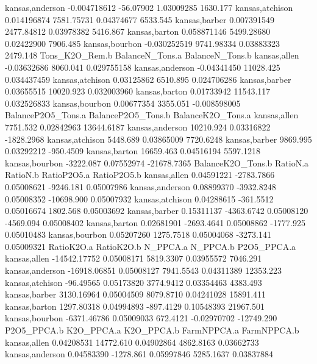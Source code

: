 \documentclass{report}
\begin{document}
\begin{Schunk}
\begin{Soutput}
kansas,anderson -0.004718612       -56.07902      1.03009285       1630.177
kansas,atchison  0.014196874      7581.75731      0.04374677       6533.545
kansas,barber    0.007391549      2477.84812      0.03978382       5416.867
kansas,barton    0.058871146      5499.28680      0.02422900       7906.485
kansas,bourbon  -0.030252519      9741.98334      0.03883323       2479.148
                Tons_K2O_Rem.b BalanceN_Tons.a BalanceN_Tons.b
kansas,allen       -0.03632686        8060.041     0.029755158
kansas,anderson    -0.04341450       11028.425     0.034437459
kansas,atchison     0.03125862        6510.895     0.024706286
kansas,barber       0.03655515       10020.923     0.032003960
kansas,barton       0.01733942       11543.117     0.032526833
kansas,bourbon      0.00677354        3355.051    -0.008598005
                BalanceP2O5_Tons.a BalanceP2O5_Tons.b BalanceK2O_Tons.a
kansas,allen              7751.532         0.02842963        13644.6187
kansas,anderson          10210.924         0.03316822        -1828.2968
kansas,atchison           5448.689         0.03865009         7720.6248
kansas,barber             9869.995         0.03292212         -950.4509
kansas,barton            16659.463         0.04516194         5597.1218
kansas,bourbon           -3222.087         0.07552974       -21678.7365
                BalanceK2O_Tons.b   RatioN.a   RatioN.b RatioP2O5.a RatioP2O5.b
kansas,allen           0.04591221 -2783.7866 0.05008621   -9246.181  0.05007986
kansas,anderson        0.08899370 -3932.8248 0.05008352  -10698.900  0.05007932
kansas,atchison        0.04288615  -361.5512 0.05016674    1802.568  0.05003692
kansas,barber          0.15311137 -4363.6742 0.05008120   -4569.094  0.05008402
kansas,barton          0.02681901 -2693.4641 0.05008862   -1777.925  0.05010483
kansas,bourbon         0.05207260  1275.7518 0.05004068   -3273.141  0.05009321
                  RatioK2O.a RatioK2O.b  N_PPCA.a    N_PPCA.b P2O5_PPCA.a
kansas,allen    -14542.17752 0.05008171 5819.3307  0.03955572    7046.291
kansas,anderson -16918.06851 0.05008127 7941.5543  0.04311389   12353.223
kansas,atchison    -96.49565 0.05173820 3774.9412  0.03354463    4383.493
kansas,barber     3130.16964 0.05004509 8079.8710  0.04241028   15891.411
kansas,barton     1297.80318 0.04994893 -897.4129  0.10548393   21967.501
kansas,bourbon   -6371.46786 0.05009033  672.4121 -0.02970702  -12749.290
                P2O5_PPCA.b K2O_PPCA.a K2O_PPCA.b FarmNPPCA.a FarmNPPCA.b
kansas,allen     0.04208531  14772.610 0.04902864   4862.8163  0.03662733
kansas,anderson  0.04583390  -1278.861 0.05997846   5285.1637  0.03837884

\end{Soutput}
\end{Schunk}
\end{document}
